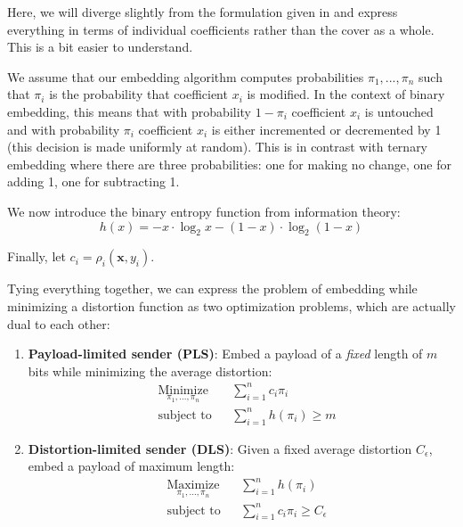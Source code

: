\documentclass[11pt,a4paper,twoside,openright]{report}
\begin{document}
Here, we will diverge slightly from the formulation given in \cite{stc-paper} and express everything in terms of individual coefficients rather than the cover as a whole. This is a bit easier to understand.

We assume that our embedding algorithm computes probabilities $\pi_1,...,\pi_n$ such that $\pi_i$ is the probability that coefficient $x_i$ is modified. In the context of binary embedding, this means that with probability $1-\pi_i$ coefficient $x_i$ is untouched and with probability $\pi_i$ coefficient $x_i$ is either incremented or decremented by 1 (this decision is made uniformly at random). This is in contrast with ternary embedding where there are three probabilities: one for making no change, one for adding 1, one for subtracting 1.

We now introduce the binary entropy function from information theory:
\begin{equation*}
	h(x) = -x \cdot \log_2 x - (1-x) \cdot \log_2{(1-x)}
\end{equation*}

Finally, let $c_i = \rho_i(\bm{x},y_i)$. 

Tying everything together, we can express the problem of embedding while minimizing a distortion function as two optimization problems, which are actually dual to each other:
\begin{enumerate}

	\item \textbf{Payload-limited sender (PLS)}: Embed a payload of a \textit{fixed} length of $m$ bits while minimizing the average distortion:
		\begin{equation*}
			\begin{aligned}
			& \underset{\pi_1,...,\pi_n}{\text{Minimize}}
			& & \sum_{i=1}^{n} c_i \pi_i \\
			& \text{subject to}
			& & \sum_{i=1}^{n} h(\pi_i) \geq m
			\end{aligned}
		\end{equation*}

	\item \textbf{Distortion-limited sender (DLS)}: Given a fixed average distortion $C_{\epsilon}$, embed a payload of maximum length:
		\begin{equation*}
			\begin{aligned}
			& \underset{\pi_1,...,\pi_n}{\text{Maximize}}
			& & \sum_{i=1}^{n} h(\pi_i) \\
			& \text{subject to}
			& & \sum_{i=1}^{n} c_i \pi_i \geq C_{\epsilon}
			\end{aligned}
		\end{equation*}

\end{enumerate}
\end{document}

